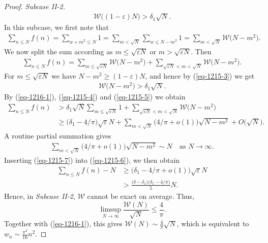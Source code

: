 \documentclass[10pt,a4paper]{amsart}
\begin{document}
\begin{proof}
{\it Subcase II-2.}  
\begin{align}\label{eq-1215-3}
\mathcal{W}\Big((1-\varepsilon)N\Big)>\delta_1 \sqrt{N}.
\end{align} 
In this subcase, we first note that
\begin{align*}
\sum_{n\le N}f(n)=\sum_{w+m^2\le N}1=\sum_{m<\sqrt{N}}\sum_{w\le N-m^2}1=\sum_{m<\sqrt{N}}\mathcal{W}\big(N-m^2\big).
\end{align*} 
We now split the sum according as $m\le \sqrt{\varepsilon N}$ or $m>\sqrt{\varepsilon N}$. Then
\begin{align}\label{eq-1215-4}
\sum_{n\le N}f(n)=\sum_{m\le \sqrt{\varepsilon N}}\mathcal{W}\big(N-m^2\big)+\sum_{\sqrt{\varepsilon N}< m<\sqrt{N}}\mathcal{W}\big(N-m^2\big).
\end{align} 
For $m\le \sqrt{\varepsilon N}$ we have $N-m^2\ge (1-\varepsilon)N$, and hence by (\ref{eq-1215-3}) we get
\begin{align}\label{eq-1215-5}
\mathcal{W}\big(N-m^2\big)>\delta_1 \sqrt{N}.
\end{align}
By (\ref{eq-1216-1}), (\ref{eq-1215-4}) and (\ref{eq-1215-5}) we obtain 
\begin{align}\label{eq-1215-6}
\sum_{n\le N}f(n)&>\delta_1 \sqrt{N}\sum_{m\le \sqrt{\varepsilon N}}1+\sum_{\sqrt{\varepsilon N}< m<\sqrt{N}}\mathcal{W}\big(N-m^2\big)\nonumber\\
&\ge \big(\delta_1-4/\pi\big) \sqrt{\varepsilon}N +\sum_{m<\sqrt{N}}\Big(4/\pi+o(1)\Big)\sqrt{N-m^2}+O\big(\sqrt{N}\big).
\end{align}
A routine partial summation gives
\begin{align}\label{eq-1215-7}
\sum_{m<\sqrt{N}}\Big(4/\pi+o(1)\Big)\sqrt{N-m^2}\sim N \quad \text{as }N\rightarrow\infty.
\end{align}
Inserting (\ref{eq-1215-7}) into (\ref{eq-1215-6}), we then obtain
\begin{align*}
\sum_{n\le N}f(n)-N&\ge \Big(\delta_1-4/\pi+o(1)\Big) \sqrt{\varepsilon}N\\
&> \frac{\big(\delta-\delta_1\big)\big(\delta_1-4/\pi\big)}{5}N.
\end{align*} 
Hence, in {\it Subcase II-2}, $\mathcal{W}$ cannot be exact on average.
Thus,
\[
 \limsup_{N\to\infty}\frac{\mathcal{W}(N)}{\sqrt N}\le \frac{4}{\pi}.
\]
Together with (\ref{eq-1216-1}), this gives $\mathcal{W}(N)\sim \frac{4}{\pi}\sqrt N$, which is equivalent to $w_n\sim \frac{\pi^2}{16}n^2$.
\end{proof}
\end{document}
